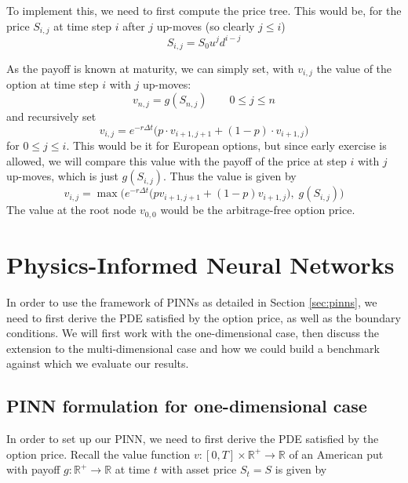 To implement this, we need to first compute the price tree. This would be, for the price $S_{i, j}$ at time step $i$ after $j$ up-moves (so clearly $j \le i$)
\begin{equation}
S_{i, j} = S_0 u^j d^{i-j}
\end{equation}

As the payoff is known at maturity, we can simply set, with $v_{i, j}$ the value of the option at time step $i$ with $j$ up-moves:
\begin{equation}
v_{n, j} = g(S_{n, j}) \qquad 0 \le j \le n
\end{equation}
and recursively set
\begin{equation}
v_{i, j} = e^{-r\Delta t} \big(p \cdot v_{i+1, j+1} + (1-p) \cdot v_{i+1, j}\big)
\end{equation}
for $0 \le j \le i$. This would be it for European options, but since early exercise is allowed, we will compare this value with the payoff of the price at step $i$ with $j$ up-moves, which is just $g(S_{i, j})$. Thus the value is given by
\begin{equation}
v_{i, j} = \max\bigg(e^{-r\Delta t} \big(p v_{i+1, j+1} + (1-p)v_{i+1, j}\big), \; g(S_{i, j})\bigg)
\end{equation}
The value at the root node $v_{0, 0}$ would be the arbitrage-free option price.

\section{Physics-Informed Neural Networks}

In order to use the framework of PINNs as detailed in Section \ref{sec:pinns}, we need to first derive the PDE satisfied by the option price, as well as the boundary conditions. We will first work with the one-dimensional case, then discuss the extension to the multi-dimensional case and how we could build a benchmark against which we evaluate our results.

\subsection{PINN formulation for one-dimensional case}

In order to set up our PINN, we need to first derive the PDE satisfied by the option price. Recall the value function $v: [0, T] \times \mathbb R^+ \to \mathbb R$ of an American put with payoff $g: \mathbb R^+ \to \mathbb R$ at time $t$ with asset price $S_t = S$ is given by

